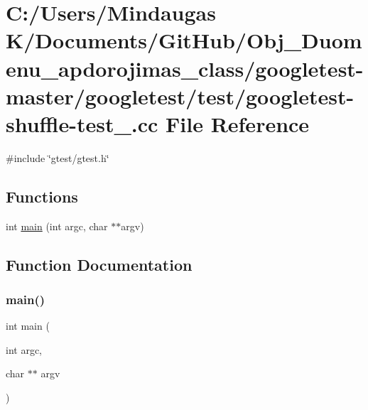 \hypertarget{googletest-master_2googletest_2test_2googletest-shuffle-test___8cc}{}\section{C\+:/\+Users/\+Mindaugas K/\+Documents/\+Git\+Hub/\+Obj\+\_\+\+Duomenu\+\_\+apdorojimas\+\_\+class/googletest-\/master/googletest/test/googletest-\/shuffle-\/test\+\_\+.cc File Reference}
\label{googletest-master_2googletest_2test_2googletest-shuffle-test___8cc}
{\ttfamily \#include \char`\"{}gtest/gtest.\+h\char`\"{}}\newline
\subsection*{Functions}
\begin{DoxyCompactItemize}
\item 
int \mbox{\hyperlink{googletest-master_2googletest_2test_2googletest-shuffle-test___8cc_a3c04138a5bfe5d72780bb7e82a18e627}{main}} (int argc, char $\ast$$\ast$argv)
\end{DoxyCompactItemize}


\subsection{Function Documentation}
\mbox{\label{googletest-master_2googletest_2test_2googletest-shuffle-test___8cc_a3c04138a5bfe5d72780bb7e82a18e627}} 
\subsubsection{\texorpdfstring{main()}{main()}}
{\footnotesize\ttfamily int main (\begin{DoxyParamCaption}\item[{int}]{argc,  }\item[{char $\ast$$\ast$}]{argv }\end{DoxyParamCaption})}

